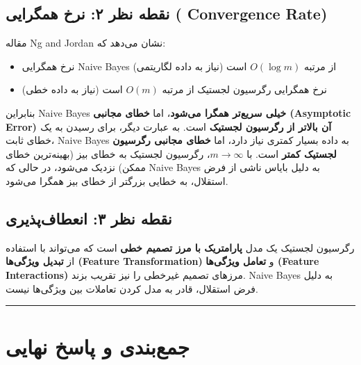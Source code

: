 \documentclass[11pt,a4paper]{article}
\newcommand{\en}[1]{\textenglish{#1}}
\newcommand{\separator}{\vspace{1em}\noindent\rule{\linewidth}{0.4pt}\vspace{1em}}
\begin{document}
\subsection{نقطه نظر ۲: نرخ همگرایی ( \en{Convergence Rate})}

مقاله \en{Ng and Jordan} نشان می‌دهد که:

\begin{itemize}
    \item نرخ همگرایی \en{Naive Bayes} از مرتبه \(O(\log m)\) است (نیاز به داده لگاریتمی)
    \item نرخ همگرایی رگرسیون لجستیک از مرتبه \(O(m)\) است (نیاز به داده خطی)
\end{itemize}

بنابراین \en{Naive Bayes} \textbf{خیلی سریع‌تر همگرا می‌شود}، اما \textbf{خطای مجانبی (\en{Asymptotic Error}) آن بالاتر از رگرسیون لجستیک} است. به عبارت دیگر، برای رسیدن به یک خطای ثابت، \en{Naive Bayes} به داده بسیار کمتری نیاز دارد، اما \textbf{خطای مجانبی رگرسیون لجستیک کمتر} است. با \(m \to \infty\)، رگرسیون لجستیک به خطای بیز (بهینه‌ترین خطای ممکن) نزدیک می‌شود، در حالی که \en{Naive Bayes} به دلیل بایاس ناشی از فرض استقلال، به خطایی بزرگتر از خطای بیز همگرا می‌شود.

\subsection{نقطه نظر ۳: انعطاف‌پذیری}

رگرسیون لجستیک یک مدل \textbf{پارامتریک با مرز تصمیم خطی} است که می‌تواند با استفاده از \textbf{تبدیل ویژگی‌ها (\en{Feature Transformation})} و \textbf{تعامل ویژگی‌ها (\en{Feature Interactions})} مرزهای تصمیم غیرخطی را نیز تقریب بزند. \en{Naive Bayes} به دلیل فرض استقلال، قادر به مدل کردن تعاملات بین ویژگی‌ها نیست.

\separator
\section{جمع‌بندی و پاسخ نهایی}
\end{document}
